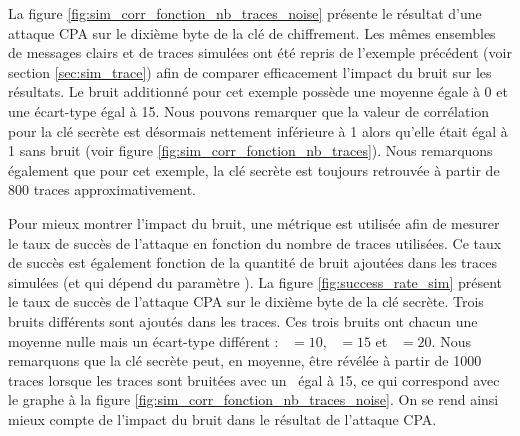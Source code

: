 \documentclass[oneside]{book}
\begin{document}
\hspace{-0.5cm}La figure \ref{fig:sim_corr_fonction_nb_traces_noise} présente le résultat d'une attaque CPA sur le dixième byte de la clé de chiffrement. Les mêmes ensembles de messages clairs et de traces simulées ont été repris de l'exemple précédent (voir section \ref{sec:sim_trace}) afin de comparer efficacement l'impact du bruit sur les résultats. Le bruit additionné pour cet exemple possède une moyenne égale à 0 et une écart-type égal à 15. Nous pouvons remarquer que la valeur de corrélation pour la clé secrète est désormais nettement inférieure à 1 alors qu'elle était égal à 1 sans bruit (voir figure \ref{fig:sim_corr_fonction_nb_traces}). Nous remarquons également que pour cet exemple, la clé secrète est toujours retrouvée à partir de 800 traces approximativement.

\hspace{-0.5cm}Pour mieux montrer l'impact du bruit, une métrique est utilisée afin de mesurer le taux de succès de l'attaque en fonction du nombre de traces utilisées. Ce taux de succès est également fonction de la quantité de bruit ajoutées dans les traces simulées (et qui dépend du paramètre \sigma). La figure \ref{fig:success_rate_sim} présent le taux de succès de l'attaque CPA sur le dixième byte de la clé secrète. Trois bruits différents sont ajoutés dans les traces. Ces trois bruits ont chacun une moyenne nulle mais un écart-type différent : \sigma \ $= 10$, \sigma \ $= 15$ et \sigma \ $= 20$. Nous remarquons que la clé secrète peut, en moyenne, être révélée à partir de 1000 traces lorsque les traces sont bruitées avec un \sigma \ égal à 15, ce qui correspond avec le graphe à la figure \ref{fig:sim_corr_fonction_nb_traces_noise}. On se rend ainsi mieux compte de l'impact du bruit dans le résultat de l'attaque CPA. 
\end{document}
